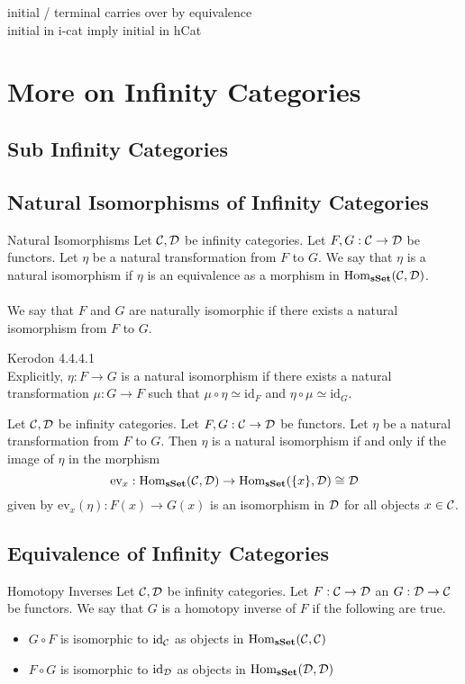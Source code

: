 \documentclass[a4paper]{article}
\begin{document}
initial / terminal carries over by equivalence\\

initial in i-cat imply initial in hCat

\pagebreak
\section{More on Infinity Categories}
\subsection{Sub Infinity Categories}

\subsection{Natural Isomorphisms of Infinity Categories}
\begin{defn}{Natural Isomorphisms}{} Let $\mathcal{C},\mathcal{D}$ be infinity categories. Let $F,G:\mathcal{C}\to\mathcal{D}$ be functors. Let $\eta$ be a natural transformation from $F$ to $G$. We say that $\eta$ is a natural isomorphism if $\eta$ is an equivalence as a morphism in $\operatorname{Hom}_\bold{sSet}(\mathcal{C},\mathcal{D})$. \\~\\

We say that $F$ and $G$ are naturally isomorphic if there exists a natural isomorphism from $F$ to $G$. 
\end{defn}

Kerodon 4.4.4.1\\

Explicitly, $\eta:F\to G$ is a natural isomorphism if there exists a natural transformation $\mu:G\to F$ such that $\mu\circ\eta\simeq\text{id}_F$ and $\eta\circ\mu\simeq\text{id}_G$. 

\begin{prp}{}{} Let $\mathcal{C},\mathcal{D}$ be infinity categories. Let $F,G:\mathcal{C}\to\mathcal{D}$ be functors. Let $\eta$ be a natural transformation from $F$ to $G$. Then $\eta$ is a natural isomorphism if and only if the image of $\eta$ in the morphism $$\text{ev}_x:\operatorname{Hom}_\bold{sSet}(\mathcal{C},\mathcal{D})\to\operatorname{Hom}_\bold{sSet}(\{x\},\mathcal{D})\cong\mathcal{D}$$ given by $\text{ev}_x(\eta):F(x)\to G(x)$ is an isomorphism in $\mathcal{D}$ for all objects $x\in\mathcal{C}$. 
\end{prp}

\subsection{Equivalence of Infinity Categories}
\begin{defn}{Homotopy Inverses}{} Let $\mathcal{C},\mathcal{D}$ be infinity categories. Let $F:\mathcal{C}\to\mathcal{D}$ an $G:\mathcal{D}\to\mathcal{C}$ be functors. We say that $G$ is a homotopy inverse of $F$ if the following are true. 
\begin{itemize}
\item $G\circ F$ is isomorphic to $\text{id}_{\mathcal{C}}$ as objects in $\operatorname{Hom}_\bold{sSet}(\mathcal{C},\mathcal{C})$
\item $F\circ G$ is isomorphic to $\text{id}_{\mathcal{D}}$ as objects in $\operatorname{Hom}_\bold{sSet}(\mathcal{D},\mathcal{D})$
\end{itemize}
\end{defn}
\end{document}
